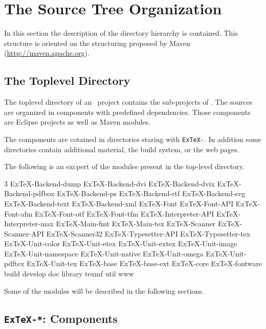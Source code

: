 \chapter{The Source Tree Organization}

In this section the description of the directory hierarchy is
contained. This structure is oriented on the structuring proposed by
Maven (\url{http://maven.apache.org}).


\section{The Toplevel Directory}

The toplevel directory of an \ExTeX\ project contains the sub-projects
of \ExTeX. The sources are organized in components with predefined
dependencies. Those components are Eclipse projects as well as Maven
modules.

The components are cotained in directories staring with
\texttt{ExTeX-}. In addition some directories contain additional
material, the build system, or the web pages.

The following is an excpert of the modules present in the top-level
directory.

{
\begin{multicols}3 \footnotesize\sf\obeylines
  ExTeX-Backend-dump
  ExTeX-Backend-dvi
  ExTeX-Backend-dvix
  ExTeX-Backend-pdfbox
  ExTeX-Backend-ps
  ExTeX-Backend-rtf
  ExTeX-Backend-svg
  ExTeX-Backend-text
  ExTeX-Backend-xml
  ExTeX-Font
  ExTeX-Font-API
  ExTeX-Font-afm
  ExTeX-Font-otf
  ExTeX-Font-tfm
  ExTeX-Interpreter-API
  ExTeX-Interpreter-max
  ExTeX-Main-fmt
  ExTeX-Main-tex
  ExTeX-Scanner
  ExTeX-Scanner-API
  ExTeX-Scanner32
  ExTeX-Typesetter-API
  ExTeX-Typesetter-tex
  ExTeX-Unit-color
  ExTeX-Unit-etex
  ExTeX-Unit-extex
  ExTeX-Unit-image
  ExTeX-Unit-namespace
  ExTeX-Unit-native
  ExTeX-Unit-omega
  ExTeX-Unit-pdftex
  ExTeX-Unit-tex
  ExTeX-base
  ExTeX-base-ext
  ExTeX-core
  ExTeX-fontware
  build
  develop
  doc
  library
  texmf
  util
  www
\end{multicols}
}


Some of the modules will be described in the following sections.


\section{\texttt{ExTeX-*}: Components}

